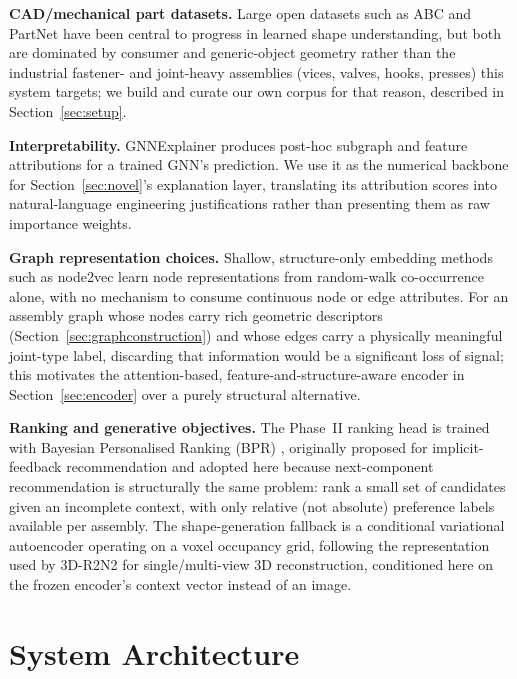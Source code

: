 \documentclass[sn-mathphys,Numbered]{sn-jnl}
\begin{document}
\textbf{CAD/mechanical part datasets.} Large open datasets such as ABC \cite{koch2019abc} and PartNet \cite{mo2019partnet} have been central to progress in learned shape understanding, but both are dominated by consumer and generic-object geometry rather than the industrial fastener- and joint-heavy assemblies (vices, valves, hooks, presses) this system targets; we build and curate our own corpus for that reason, described in Section~\ref{sec:setup}.

\textbf{Interpretability.} GNNExplainer \cite{ying2019gnnexplainer} produces post-hoc subgraph and feature attributions for a trained GNN's prediction. We use it as the numerical backbone for Section~\ref{sec:novel}'s explanation layer, translating its attribution scores into natural-language engineering justifications rather than presenting them as raw importance weights.

\textbf{Graph representation choices.} Shallow, structure-only embedding methods such as node2vec \cite{grover2016node2vec} learn node representations from random-walk co-occurrence alone, with no mechanism to consume continuous node or edge attributes. For an assembly graph whose nodes carry rich geometric descriptors (Section~\ref{sec:graphconstruction}) and whose edges carry a physically meaningful joint-type label, discarding that information would be a significant loss of signal; this motivates the attention-based, feature-and-structure-aware encoder in Section~\ref{sec:encoder} over a purely structural alternative.

\textbf{Ranking and generative objectives.} The Phase~II ranking head is trained with Bayesian Personalised Ranking (BPR) \cite{rendle2009bpr}, originally proposed for implicit-feedback recommendation and adopted here because next-component recommendation is structurally the same problem: rank a small set of candidates given an incomplete context, with only relative (not absolute) preference labels available per assembly. The shape-generation fallback is a conditional variational autoencoder \cite{kingma2014vae} operating on a voxel occupancy grid, following the representation used by 3D-R2N2 \cite{choy2016occupancy} for single/multi-view 3D reconstruction, conditioned here on the frozen encoder's context vector instead of an image.

\section{System Architecture}\label{sec:arch}
\end{document}
